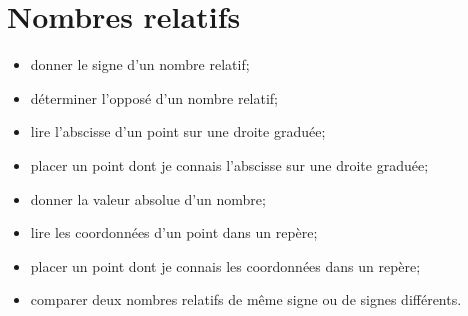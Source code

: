 \chapter{Nombres relatifs}\label{ChNbRelatifs}

\begin{acquis}
\begin{itemize}
\item donner le signe d'un nombre relatif;
\item déterminer l'opposé d'un nombre relatif;
\item lire l'abscisse d'un point sur une droite graduée;
\item placer un point dont je connais l'abscisse sur une droite graduée;
\item donner la valeur absolue d'un nombre;
\item lire les coordonnées d'un point dans un repère;
\item placer un point dont je connais les coordonnées dans un repère;
\item comparer deux nombres relatifs de même signe ou de signes différents.
\end{itemize}
\end{acquis}

\activites



\cours


\exercicesbase
\begin{colonne*exercice}

\end{colonne*exercice}


\exercicesappr
\begin{colonne*exercice}

\end{colonne*exercice}

\connaissances


\TravauxPratiques %


\pagebreak

\recreation



